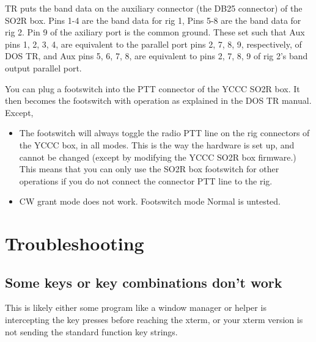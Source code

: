 \documentclass[12pt]{article}
\begin{document}
TR puts the band data
on the auxiliary connector (the DB25 connector)
of the SO2R box. Pins 1-4 are the band data for rig 1, Pins 5-8 are
the band data for rig 2. Pin 9 of the axiliary port is the common ground.
These set such that Aux pins 1, 2, 3, 4,
are equivalent to the parallel port pins 2, 7, 8, 9, respectively, of DOS TR,
and Aux pins 5, 6, 7, 8, are equivalent to pins 2, 7, 8, 9 of rig 2's
band output parallel port.

You can plug a footswitch
into the PTT connector of the YCCC SO2R box.
It then becomes the footswitch with operation as explained in the DOS TR
manual. Except,
\begin{itemize}
\item
The footswitch will always toggle the radio PTT line
on the rig connectors of the YCCC box, in all modes. This is the way the
hardware is set up, and cannot be changed (except by modifying the
YCCC SO2R box firmware.) This means that you can only use the
SO2R box footswitch for other operations if you do not connect the
connector PTT line to the rig.
\item
CW grant mode does not work. Footswitch mode Normal is untested.
\end{itemize}

\section{Troubleshooting}
\subsection{Some keys or key combinations don't work}
This is likely either some program like a window manager or helper
is intercepting the key presses before reaching the xterm, or your xterm
version is not sending the standard function key strings.
\end{document}
